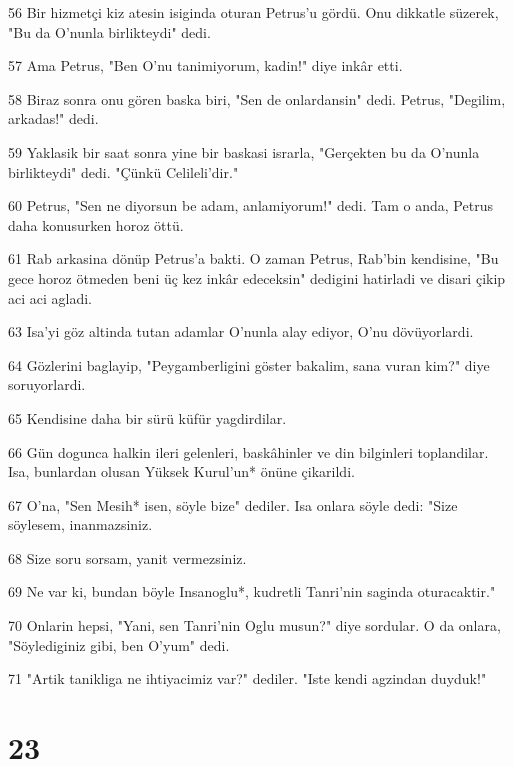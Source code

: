\par 56 Bir hizmetçi kiz atesin isiginda oturan Petrus'u gördü. Onu dikkatle süzerek, "Bu da O'nunla birlikteydi" dedi.
\par 57 Ama Petrus, "Ben O'nu tanimiyorum, kadin!" diye inkâr etti.
\par 58 Biraz sonra onu gören baska biri, "Sen de onlardansin" dedi. Petrus, "Degilim, arkadas!" dedi.
\par 59 Yaklasik bir saat sonra yine bir baskasi israrla, "Gerçekten bu da O'nunla birlikteydi" dedi. "Çünkü Celileli'dir."
\par 60 Petrus, "Sen ne diyorsun be adam, anlamiyorum!" dedi. Tam o anda, Petrus daha konusurken horoz öttü.
\par 61 Rab arkasina dönüp Petrus'a bakti. O zaman Petrus, Rab'bin kendisine, "Bu gece horoz ötmeden beni üç kez inkâr edeceksin" dedigini hatirladi ve disari çikip aci aci agladi.
\par 63 Isa'yi göz altinda tutan adamlar O'nunla alay ediyor, O'nu dövüyorlardi.
\par 64 Gözlerini baglayip, "Peygamberligini göster bakalim, sana vuran kim?" diye soruyorlardi.
\par 65 Kendisine daha bir sürü küfür yagdirdilar.
\par 66 Gün dogunca halkin ileri gelenleri, baskâhinler ve din bilginleri toplandilar. Isa, bunlardan olusan Yüksek Kurul'un* önüne çikarildi.
\par 67 O'na, "Sen Mesih* isen, söyle bize" dediler. Isa onlara söyle dedi: "Size söylesem, inanmazsiniz.
\par 68 Size soru sorsam, yanit vermezsiniz.
\par 69 Ne var ki, bundan böyle Insanoglu*, kudretli Tanri'nin saginda oturacaktir."
\par 70 Onlarin hepsi, "Yani, sen Tanri'nin Oglu musun?" diye sordular. O da onlara, "Söylediginiz gibi, ben O'yum" dedi.
\par 71 "Artik tanikliga ne ihtiyacimiz var?" dediler. "Iste kendi agzindan duyduk!"

\chapter{23}

